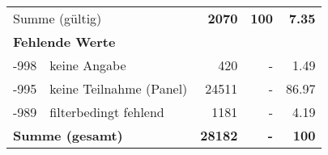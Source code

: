 \begin{longtable}{lXrrr}
     \midrule
     \multicolumn{2}{l}{Summe (gültig)} &
       \textbf{\num{2070}} &
     \textbf{100} &
       \textbf{\num[round-mode=places,round-precision=2]{7,35}} \\
     \multicolumn{5}{l}{\textbf{Fehlende Werte}}\\
       -998 &
       keine Angabe &
         \num{420} &
        - &
         \num[round-mode=places,round-precision=2]{1,49} \\
       -995 &
       keine Teilnahme (Panel) &
         \num{24511} &
        - &
         \num[round-mode=places,round-precision=2]{86,97} \\
       -989 &
       filterbedingt fehlend &
         \num{1181} &
        - &
         \num[round-mode=places,round-precision=2]{4,19} \\
     \midrule
     \multicolumn{2}{l}{\textbf{Summe (gesamt)}} &
          \textbf{\num{28182}} &
        \textbf{-} &
        \textbf{100} \\
     \bottomrule
     \end{longtable}
     
